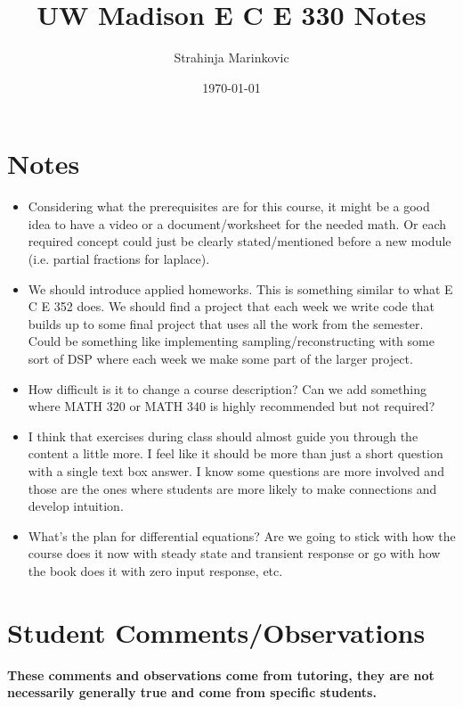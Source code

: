 \documentclass[12pt]{article}
\title{UW Madison E C E 330 Notes}
\author{Strahinja Marinkovic}
\date{\today}
\begin{document}
\maketitle

\section*{Notes}

\begin{itemize}
    \item Considering what the prerequisites are for this course, it might be a good idea to have a video or a document/worksheet for the needed math. Or each required concept could just be clearly stated/mentioned before a new module (i.e. partial fractions for laplace).
    \item We should introduce applied homeworks. This is something similar to what E C E 352 does. We should find a project that each week we write code that builds up to some final project that uses all the work from the semester. Could be something like implementing sampling/reconstructing with some sort of DSP where each week we make some part of the larger project.
    \item How difficult is it to change a course description? Can we add something where MATH 320 or MATH 340 is highly recommended but not required?
    \item I think that exercises during class should almost guide you through the content a little more. I feel like it should be more than just a short question with a single text box answer. I know some questions are more involved and those are the ones where students are more likely to make connections and develop intuition. 
    \item What's the plan for differential equations? Are we going to stick with how the course does it now with steady state and transient response or go with how the book does it with zero input response, etc.
\end{itemize}

\newpage
\section*{Student Comments/Observations}

\textbf{These comments and observations come from tutoring, they are not necessarily generally true and come from specific students.}
\end{document}

